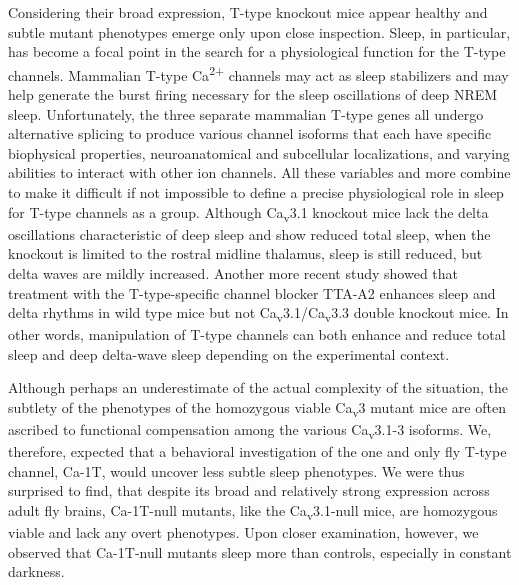 Considering their broad expression, T-type knockout mice appear healthy and subtle mutant phenotypes emerge only upon close inspection.
Sleep, in particular, has become a focal point in the search for a physiological function for the T-type channels.
Mammalian T-type Ca\textsuperscript{2+} channels may act as sleep stabilizers and may help generate the burst firing necessary for the sleep oscillations of deep NREM sleep.
Unfortunately, the three separate mammalian T-type genes all undergo alternative splicing to produce various channel isoforms that each have specific biophysical properties, neuroanatomical and subcellular localizations, and varying abilities to interact with other ion channels.
All these variables and more combine to make it difficult if not impossible to define a precise physiological role in sleep for T-type channels as a group.
Although Ca\textsubscript{v}3.1 knockout mice lack the delta oscillations characteristic of deep sleep and show reduced total sleep\cite{Lee:2004ey}, when the knockout is limited to the rostral midline thalamus, sleep is still reduced, but delta waves are mildly increased\cite{anderson:2005aa}. Another more recent study showed that treatment with the T-type-specific channel blocker TTA-A2 enhances sleep and delta rhythms in wild type mice but not Ca\textsubscript{v}3.1/Ca\textsubscript{v}3.3 double knockout mice\cite{kraus:2010aa}. In other words, manipulation of T-type channels can both enhance and reduce total sleep and deep delta-wave sleep depending on the experimental context.

Although perhaps an underestimate of the actual complexity of the situation, the subtlety of the phenotypes of the homozygous viable Ca\textsubscript{v}3 mutant mice are often ascribed to functional compensation among the various Ca\textsubscript{v}3.1-3 isoforms\cite{senatore:2012aa}.
We, therefore, expected that a behavioral investigation of the one and only fly T-type channel, Ca-\alpha1T, would uncover less subtle sleep phenotypes.
We were thus surprised to find, that despite its broad and relatively strong expression across adult fly brains, Ca-\alpha1T-null mutants, like the Ca\textsubscript{v}3.1-null mice, are homozygous viable and lack any overt phenotypes.
Upon closer examination, however, we observed that Ca-\alpha1T-null mutants sleep more than controls, especially in constant darkness.

